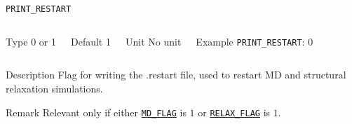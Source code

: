 \documentclass[xcolor=dvipsnames,t]{beamer}
\begin{document}
\begin{frame}[allowframebreaks]{\texttt{PRINT\_RESTART}} \label{PRINT_RESTART}
\vspace*{-12pt}
\begin{columns}
\begin{block}{Type}
0 or 1
\end{block}

\begin{block}{Default}
1
\end{block}

\begin{block}{Unit}
No unit
\end{block}

\begin{block}{Example}
\texttt{PRINT\_RESTART}: 0
\end{block}
\end{columns}

\begin{block}{Description}
Flag for writing the .restart file, used to restart MD and structural relaxation simulations. 
\end{block}

\begin{block}{Remark}
Relevant only if either \hyperlink{MD_FLAG}{\texttt{MD\_FLAG}} is $1$ or \hyperlink{RELAX_FLAG}{\texttt{RELAX\_FLAG}} is $1$.
\end{block}

\end{frame}
\end{document}
